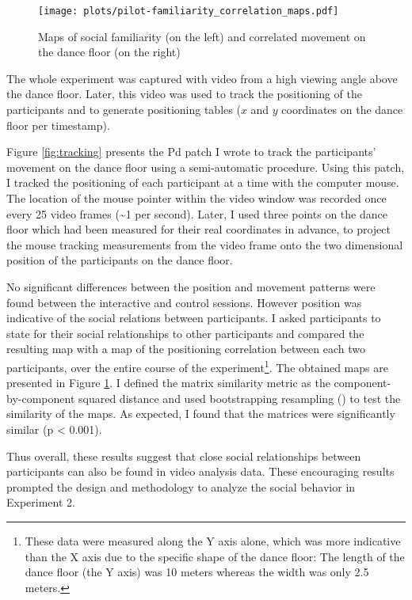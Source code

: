 \documentclass[a4paper,11pt]{article}
\begin{document}
{\begin{figure}[!htb]
    \centering
    \texttt{[image: plots/pilot-familiarity\_correlation\_maps.pdf]}
    \caption{Maps of social familiarity (on the left) and correlated movement on the dance floor (on the right)}\label{plot:pilot-familiarity_correlation_maps}
\end{figure}

The whole experiment was captured with video from a high viewing angle above the dance floor.
Later, this video was used to track the positioning of the participants and to generate positioning tables ($x$ and $y$ coordinates on the dance floor per timestamp).

Figure \ref{fig:tracking} presents the Pd patch I wrote to track the participants' movement on the dance floor using a semi-automatic procedure.
Using this patch, I tracked the positioning of each participant at a time with the computer mouse.
The location of the mouse pointer within the video window was recorded once every 25 video frames (\textasciitilde{}1 per second).
Later, I used three points on the dance floor which had been measured for their real coordinates in advance, to project the mouse tracking measurements from the video frame onto the two dimensional position of the participants on the dance floor.

No significant differences between the position and movement patterns were found between the interactive and control sessions.
However position was indicative of the social relations between participants.
I asked participants to state for their social relationships to other participants and compared the resulting map with a map of the positioning correlation between each two participants, over the entire course of the experiment\footnote{These data were measured along the Y axis alone, which was more indicative than the X axis due to the specific shape of the dance floor: The length of the dance floor (the Y axis) was 10 meters whereas the width was only 2.5 meters.}.
The obtained maps are presented in Figure \ref{plot:pilot-familiarity_correlation_maps}.
I defined the matrix similarity metric as the component-by-component squared distance and used bootstrapping resampling (\cite{good2006permutation}) to test the similarity of the maps.
As expected, I found that the matrices were significantly similar (p \textless{} 0.001).

Thus overall, these results suggest that close social relationships between participants can also be found in video analysis data.
These encouraging results prompted the design and methodology to analyze the social behavior in Experiment 2.

}
\end{document}
